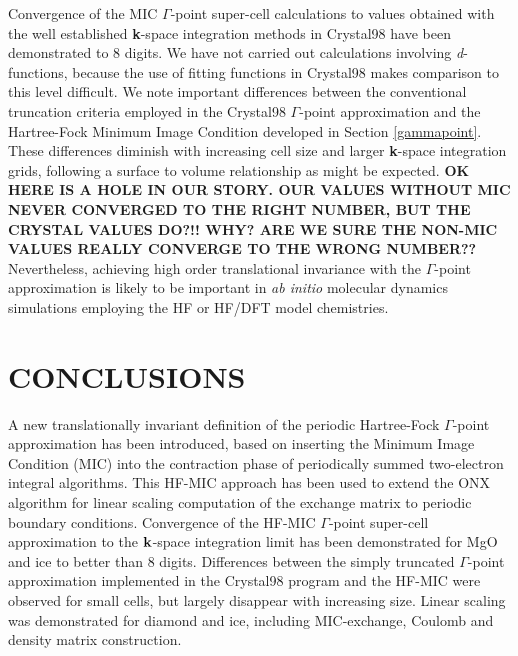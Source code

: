 \documentclass[prb,aps,nobibnotes,twocolumn,doublespace,twocolumngrid,superbib]{revtex4}
\begin{document}
Convergence of the MIC $\Gamma$-point super-cell calculations to values obtained with 
the well established {{\bf k}}-space integration methods in {\sc Crystal98} have been 
demonstrated to 8 digits.  We have not carried out calculations involving 
{\it d}-functions, because the use of fitting functions in {\sc Crystal98} makes
comparison to this level difficult.  We note important differences between the 
conventional truncation criteria employed in the {\sc Crystal98} $\Gamma$-point
approximation and the Hartree-Fock Minimum Image Condition developed in Section 
\ref{gammapoint}.  These differences diminish with increasing cell size and larger 
{\bf k}-space integration grids, following a surface to volume relationship 
as might be expected. {\bf OK HERE IS A HOLE IN OUR STORY.  OUR VALUES WITHOUT MIC
NEVER CONVERGED TO THE RIGHT NUMBER, BUT THE CRYSTAL VALUES DO?!!  WHY?  ARE WE
SURE THE NON-MIC VALUES REALLY CONVERGE TO THE WRONG NUMBER??}
Nevertheless, achieving high order translational invariance 
with the $\Gamma$-point approximation is likely to be important in {\em ab initio} 
molecular dynamics simulations employing the HF or HF/DFT model chemistries.


\section{CONCLUSIONS}

A new translationally invariant definition of the periodic Hartree-Fock 
$\Gamma$-point approximation has been introduced, based on inserting 
the Minimum Image Condition (MIC) into the contraction phase of periodically
summed two-electron integral algorithms.  This HF-MIC approach has been used 
to extend the {\sc ONX} algorithm for linear scaling computation of the exchange 
matrix to periodic boundary conditions.  Convergence of the HF-MIC $\Gamma$-point
super-cell approximation to the ${\bf k}$-space integration limit has been 
demonstrated for MgO and ice to better than 8 digits.  Differences between
the simply truncated $\Gamma$-point approximation implemented in the 
{\sc Crystal98} program and the HF-MIC were observed for small cells, but
largely disappear with increasing size. Linear scaling was demonstrated for
diamond and ice, including MIC-exchange, Coulomb and density matrix 
construction.   
\end{document}
